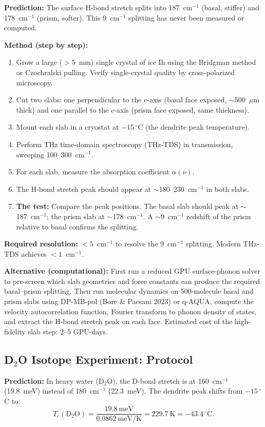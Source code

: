\documentclass[12pt,letterpaper]{article}
\begin{document}
\textbf{Prediction:} The surface H-bond stretch splits into 187~cm$^{-1}$ (basal, stiffer) and 178~cm$^{-1}$ (prism, softer).  This 9~cm$^{-1}$ splitting has never been measured or computed.

\textbf{Method (step by step):}
\begin{enumerate}[nosep]
\item Grow a large ($> 5$~mm) single crystal of ice Ih using the Bridgman method or Czochralski pulling.  Verify single-crystal quality by cross-polarized microscopy.
\item Cut two slabs: one perpendicular to the c-axis (basal face exposed, $\sim$500~$\mu$m thick) and one parallel to the c-axis (prism face exposed, same thickness).
\item Mount each slab in a cryostat at $-15\,{}^\circ$C (the dendrite peak temperature).
\item Perform THz time-domain spectroscopy (THz-TDS) in transmission, sweeping 100--300~cm$^{-1}$.
\item For each slab, measure the absorption coefficient $\alpha(\nu)$.
\item The H-bond stretch peak should appear at $\sim$180--230~cm$^{-1}$ in both slabs.
\item \textbf{The test:} Compare the peak positions.  The basal slab should peak at $\sim$187~cm$^{-1}$; the prism slab at $\sim$178~cm$^{-1}$.  A $\sim$9~cm$^{-1}$ redshift of the prism relative to basal confirms the splitting.
\end{enumerate}
\textbf{Required resolution:} $< 5$~cm$^{-1}$ to resolve the 9~cm$^{-1}$ splitting.  Modern THz-TDS achieves $< 1$~cm$^{-1}$.

\textbf{Alternative (computational):} First run a reduced GPU surface-phonon solver to pre-screen which slab geometries and force constants can produce the required basal--prism splitting.  Then run molecular dynamics on 500-molecule basal and prism slabs using DP-MB-pol (Bore \& Paesani 2023) or q-AQUA, compute the velocity autocorrelation function, Fourier transform to phonon density of states, and extract the H-bond stretch peak on each face.  Estimated cost of the high-fidelity slab step: 2--5 GPU-days.

\subsection{D$_2$O Isotope Experiment: Protocol}

\textbf{Prediction:} In heavy water (D$_2$O), the D-bond stretch is at 160~cm$^{-1}$ (19.8~meV) instead of 180~cm$^{-1}$ (22.3~meV).  The dendrite peak shifts from $-15\,{}^\circ$C to:
\[
T_c(\mathrm{D_2O}) = \frac{19.8~\mathrm{meV}}{0.0862~\mathrm{meV/K}} = 229.7~\mathrm{K} = -43.4\,{}^\circ\mathrm{C}.
\]
\end{document}
